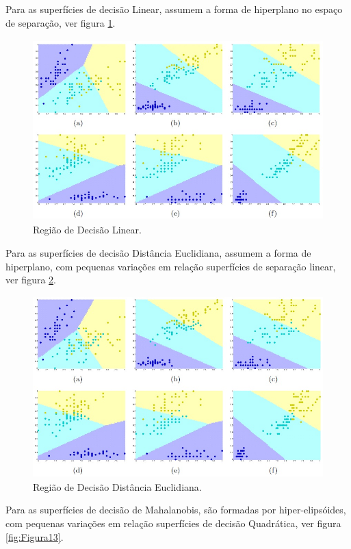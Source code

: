 \documentclass[a4paper]{article}
\begin{document}
Para as superfícies de decisão Linear, assumem a forma de hiperplano no espaço de separação, ver figura \ref{fig:Figura11}.

\begin{figure}[H]
\centering

\includegraphics[height=7cm]{Imagens/decisionboundary_type2.jpg}

\caption{Região de Decisão Linear.}
\label{fig:Figura11}
\end{figure}


Para as superfícies de decisão Distância Euclidiana, assumem a forma de hiperplano, com pequenas variações em relação superfícies de separação linear, ver figura \ref{fig:Figura12}.


\begin{figure}[H]
\centering

\includegraphics[height=7cm]{Imagens/decisionboundary_type3.jpg}

\caption{Região de Decisão Distância Euclidiana.}
\label{fig:Figura12}
\end{figure}


Para as superfícies de decisão de Mahalanobis, são formadas por hiper-elipsóides, com pequenas variações em relação superfícies de decisão Quadrática, ver figura \ref{fig:Figura13}.
\end{document}
